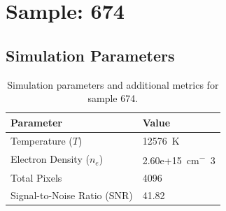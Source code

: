 \documentclass[a4paper,11pt]{article}
\begin{document}
\clearpage

\section{Sample: 674}
\subsection{Simulation Parameters}
\begin{table}[h!]
    \centering
    \begin{tabular}{ll}
        \toprule
        \textbf{Parameter} & \textbf{Value} \\
        \midrule
        Temperature ($T$) & 12576 \,\si{K} \\
        Electron Density ($n_e$) & 2.60e+15 \,\si{cm^-3} \\
        Total Pixels & 4096 \\
        Signal-to-Noise Ratio (SNR) & 41.82 \\
        \bottomrule
    \end{tabular}
    \caption{Simulation parameters and additional metrics for sample 674.}
    \label{tab:params_674}
\end{table}
\end{document}
